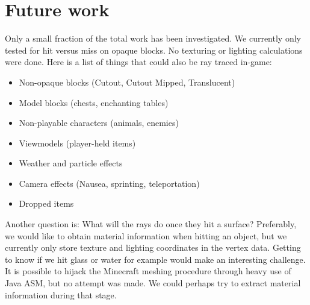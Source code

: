 \documentclass[]{article}
\begin{document}
\section{Future work}
Only a small fraction of the total work has been investigated.
We currently only tested for hit versus miss on opaque blocks.
No texturing or lighting calculations were done.
Here is a list of things that could also be ray traced in-game:
\begin{itemize}
  \item Non-opaque blocks (Cutout, Cutout Mipped, Translucent)
  \item Model blocks (chests, enchanting tables)
  \item Non-playable characters (animals, enemies)
  \item Viewmodels (player-held items)
  \item Weather and particle effects
  \item Camera effects (Nausea, sprinting, teleportation)
  \item Dropped items
\end{itemize}
Another question is: What will the rays do once they hit a surface? Preferably, we would like to obtain material information when hitting an object, but we currently only store texture and lighting coordinates in the vertex data.
Getting to know if we hit glass or water for example would make an interesting challenge.
It is possible to hijack the Minecraft meshing procedure through heavy use of Java ASM, but no attempt was made.
We could perhaps try to extract material information during that stage.

{}
%


\end{document}
